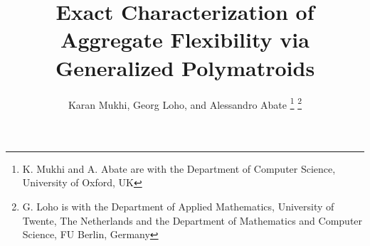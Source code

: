 \documentclass[journal]{IEEEtran}
\begin{document}
\title{Exact Characterization of Aggregate Flexibility via Generalized Polymatroids}

\author{
    Karan Mukhi,
    Georg Loho,
    and Alessandro Abate%
    \thanks{K. Mukhi and A. Abate are with the Department of Computer Science, University of Oxford, UK}
    \thanks{G. Loho is with the Department of Applied Mathematics, University of Twente, The Netherlands and the Department of Mathematics and Computer Science, FU Berlin, Germany}
}




\maketitle

\begin{abstract}

\end{abstract}
















\appendix


\vfill
\end{document}
